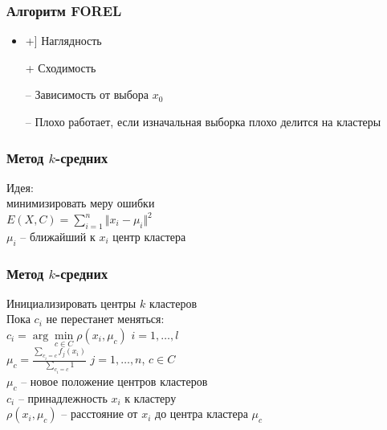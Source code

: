 \documentclass[12pt]{beamer}
\begin{document}
\begin{frame}\frametitle{Алгоритм FOREL}

\begin{itemize}
\item+] Наглядность
\item[+] Сходимость
\item[--] Зависимость от выбора $x_0$
\item[--] Плохо работает, если изначальная выборка плохо делится на кластеры
\end{itemize}

\end{frame}

\begin{frame}\frametitle{Метод $k$-средних}
Идея:\\  минимизировать меру ошибки\\
\vspace{5mm}${E(X, C) = \sum\limits_{i = 1}^n \Vert x_i -\mu_i \Vert^2}$\\
\vspace{5mm}
$\mu_i$ -- ближайший к $x_i$ центр кластера
\end{frame}

\begin{frame}\frametitle{Метод $k$-средних}
Инициализировать центры $k$ кластеров \\
\vspace{2mm}
Пока $c_i$ не перестанет меняться:\\
\hspace{5mm} $c_i = \arg\min\limits_{c \in C} \rho(x_i, \mu_c)$ \hspace{5mm} $i = 1,\dots, l$\\
\vspace{2mm}\hspace{5mm} ${\mu_c = \frac{\sum\limits_{c_i = c} f_j(x_i)}{\sum\limits_{c_i = c} 1} }$ \hspace{10mm} $j = 1,\dots, n$, $c \in C$\\
\vspace{2mm}
$\mu_c$ -- новое положение центров кластеров\\
$c_i$ -- принадлежность $x_i$ к кластеру\\
$\rho(x_i, \mu_c)$ -- расстояние от $x_i$ до центра кластера $\mu_c$
\end{frame}
\end{document}
